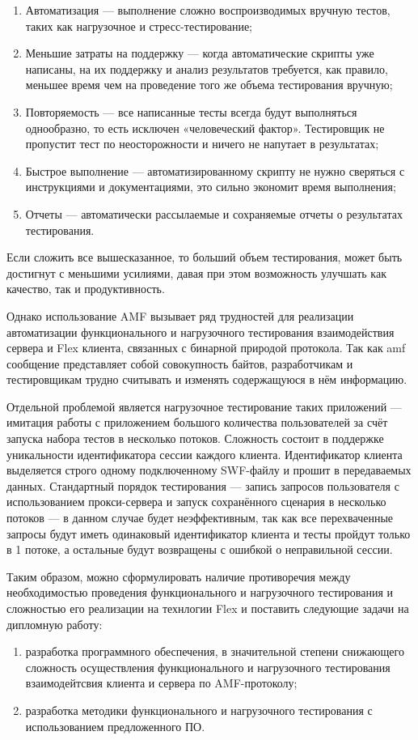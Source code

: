 \begin{enumerate}
\item Автоматизация --- выполнение сложно воспроизводимых вручную тестов, таких как нагрузочное
и стресс-тестирование;
\item Меньшие затраты на поддержку --- когда автоматические скрипты уже написаны, на их поддержку
и анализ результатов требуется, как правило, меньшее время чем на проведение того же объема тестирования вручную;
\item Повторяемость --- все написанные тесты всегда будут выполняться однообразно, то есть
исключен «человеческий фактор». Тестировщик не пропустит тест по неосторожности и ничего не
напутает в результатах;
\item Быстрое выполнение --- автоматизированному скрипту не нужно сверяться с инструкциями и
документациями, это сильно экономит время выполнения;
\item Отчеты --- автоматически рассылаемые и сохраняемые отчеты о результатах тестирования.
\end{enumerate}

Если сложить все вышесказанное, то больший объем тестирования, может быть
достигнут с меньшими усилиями, давая при этом возможность улучшать как качество, 
так и продуктивность. 

Однако использование AMF вызывает ряд трудностей для реализации автоматизации функционального 
и нагрузочного тестирования взаимодействия сервера и Flex клиента, связанных с бинарной 
природой протокола. Так как amf сообщение представляет собой совокупность байтов, 
разработчикам и тестировщикам трудно считывать и изменять содержащуюся в нём информацию.

Отдельной проблемой является нагрузочное тестирование таких приложений --- имитация работы с
приложением большого количества пользователей за счёт запуска набора тестов в несколько потоков. 
Сложность состоит в поддержке уникальности идентификатора сессии каждого клиента. Идентификатор 
клиента выделяется строго одному подключенному SWF-файлу и прошит в передаваемых данных.
Стандартный порядок тестирования --- запись запросов пользователя с использованием прокси-сервера
и запуск сохранённого сценария в несколько потоков --- в данном случае будет неэффективным, так
как все перехваченные запросы будут иметь одинаковый идентификатор клиента и тесты пройдут
только в 1 потоке, а остальные будут возвращены с ошибкой о неправильной сессии.
 
Таким образом, можно сформулировать наличие противоречия между необходимостью проведения функционального
и нагрузочного тестирования и сложностью его реализации на технлогии Flex и поставить следующие задачи на 
дипломную работу:

\begin{enumerate}
\item разработка программного обеспечения, в значительной степени снижающего сложность осуществления функционального
и нагрузочного тестирования взаимодейтсвия клиента и сервера по AMF-протоколу;
\item разработка методики функционального и нагрузочного тестирования с использованием предложенного ПО.
\end{enumerate}